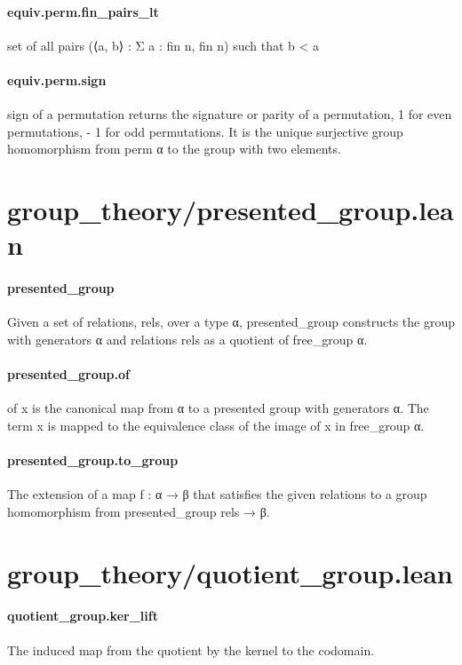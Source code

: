 \documentclass{article}
\begin{document}
\paragraph{equiv.perm.fin\_pairs\_lt}
\par
set of all pairs (⟨a, b⟩ : Σ a : fin n, fin n) such that b 
<
 a
\paragraph{equiv.perm.sign}
\par
\colorbox[RGB]{253,246,227}{{{{\color[RGB]{101, 123, 131} sign }}}} of a permutation returns the signature or parity of a permutation, 
\colorbox[RGB]{253,246,227}{{{{\color[RGB]{108, 113, 196} 1 }}}} for even
permutations, 
\colorbox[RGB]{253,246,227}{{{{\color[RGB]{181, 137, 0} - }}}{{{\color[RGB]{108, 113, 196} 1 }}}} for odd permutations. It is the unique surjective group homomorphism from
\colorbox[RGB]{253,246,227}{{{{\color[RGB]{101, 123, 131} perm α }}}} to the group with two elements.
\section{group\_theory/presented\_group.lean}\paragraph{presented\_group}
\par
Given a set of relations, rels, over a type α, presented\_group constructs the group with
generators α and relations rels as a quotient of free\_group α.
\paragraph{presented\_group.of}
\par
\colorbox[RGB]{253,246,227}{{{{\color[RGB]{101, 123, 131} of x }}}} is the canonical map from α to a presented group with generators α. The term x is
mapped to the equivalence class of the image of x in free\_group α.
\paragraph{presented\_group.to\_group}
\par
The extension of a map f : α → β that satisfies the given relations to a group homomorphism
from presented\_group rels → β.
\section{group\_theory/quotient\_group.lean}\paragraph{quotient\_group.ker\_lift}
\par
The induced map from the quotient by the kernel to the codomain.
\end{document}

